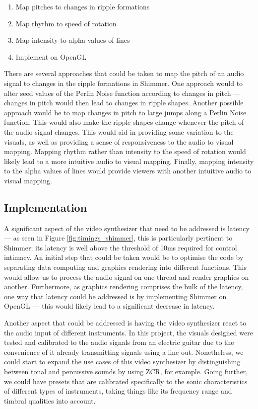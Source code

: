 \documentclass[../initial_thesis.tex]{subfiles}
\begin{document}
\begin{enumerate}
\item {Map pitches to changes in ripple formations}
\item {Map rhythm to speed of rotation}
\item {Map intensity to alpha values of lines}
\item {Implement on OpenGL}
\end{enumerate}

There are several approaches that could be taken to map the pitch of an audio signal to changes in the ripple formations in Shimmer. One approach would to alter seed values of the Perlin Noise function according to changes in pitch --- changes in pitch would then lead to changes in ripple shapes. Another possible approach would be to map changes in pitch to large jumps along a Perlin Noise function. This would also make the ripple shapes change whenever the pitch of the audio signal changes. This would aid in providing some variation to the visuals, as well as providing a sense of responsiveness to the audio to visual mapping. Mapping rhythm rather than intensity to the speed of rotation would likely lead to a more intuitive audio to visual mapping. Finally, mapping intensity to the alpha values of lines would provide viewers with another intuitive audio to visual mapping.\par

\subsection{Implementation}
A significant aspect of the video synthesizer that need to be addressed is latency --- as seen in Figure \ref{fig:timings_shimmer}, this is particularly pertinent to Shimmer; its latency is well above the threshold of 10ms required for control intimacy. An initial step that could be taken would be to optimise the code by separating data computing and graphics rendering into different functions. This would allow us to process the audio signal on one thread and render graphics on another. Furthermore, as graphics rendering comprises the bulk of the latency, one way that latency could be addressed is by implementing Shimmer on OpenGL --- this would likely lead to a significant decrease in latency. \par

Another aspect that could be addressed is having the video synthesizer react to the audio input of different instruments. In this project, the visuals designed were tested and calibrated to the audio signals from an electric guitar due to the convenience of it already transmitting signals using a line out. Nonetheless, we could start to expand the use cases of this video synthesizer by distinguishing between tonal and percussive sounds by using ZCR, for example. Going further, we could have presets that are calibrated specifically to the sonic characteristics of different types of instruments, taking things like its frequency range and timbral qualities into account.
\end{document}
